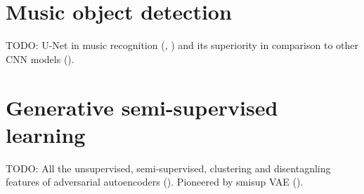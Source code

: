 \section{Music object detection}

TODO: U-Net in music recognition (\cite{DorferEtAl}, \cite{HajicEtAl}) and its superiority in comparison to other CNN models (\cite{PachaBaseline}).



\section{Generative semi-supervised learning}

TODO: All the unsupervised, semi-supervised, clustering and disentagnling features of adversarial autoencoders (\cite{AdversarialAutoencoders}). Pioneered by smisup VAE (\cite{KingmaSslVae}).

